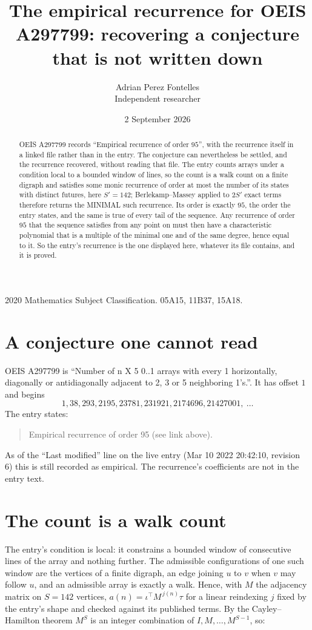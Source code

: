 \documentclass[11pt,a4paper]{article}
\title{The empirical recurrence for OEIS A297799: recovering a conjecture that is not written down}
\author{Adrian Perez Fontelles\\ \small Independent researcher}
\date{2 September 2026}
\theoremstyle{plain}
\theoremstyle{definition}
\begin{document}
\maketitle

\begin{abstract}
OEIS A297799 records ``Empirical recurrence of order $95$'', with the recurrence itself in a
linked file rather than in the entry. The conjecture can nevertheless be settled, and the
recurrence recovered, without reading that file. The entry counts arrays under a condition
local to a bounded window of lines, so the count is a walk count on a finite digraph and
satisfies some monic recurrence of order at most the number of its states with distinct
futures, here $S'=142$; Berlekamp--Massey applied to $2S'$ exact
terms therefore returns the MINIMAL such recurrence. Its order is exactly $95$, the order
the entry states, and the same is true of every tail of the sequence. Any recurrence of order
$95$ that the sequence satisfies from any point on must then have a characteristic
polynomial that is a multiple of the minimal one and of the same degree, hence equal to it. So
the entry's recurrence is the one displayed here, whatever its file contains, and it is
proved.
\end{abstract}

\noindent\small 2020 Mathematics Subject Classification. 05A15, 11B37, 15A18.\normalsize

\section{A conjecture one cannot read}

OEIS A297799 is ``Number of n X 5 0..1 arrays with every 1 horizontally, diagonally or antidiagonally adjacent to 2, 3 or 5 neighboring 1's.''. It has offset $1$ and begins
\[
1, 38, 293, 2195, 23781, 231921, 2174696, 21427001,\ \dots
\]
The entry states:
\begin{quote}
Empirical recurrence of order 95 (see link above).
\end{quote}
As of the ``Last modified'' line on the live entry (Mar 10 2022 20:42:10, revision 6) this is still
recorded as empirical. The recurrence's coefficients are not in the entry text.

\section{The count is a walk count}

The entry's condition is local: it constrains a bounded window of consecutive lines of the
array and nothing further. The admissible configurations of one such window are the vertices
of a finite digraph, an edge joining $u$ to $v$ when $v$ may follow $u$, and an admissible
array is exactly a walk. Hence, with $M$ the adjacency matrix on $S=142$ vertices,
$a(n)=\iota^{\!\top}M^{\,j(n)}\tau$ for a linear reindexing $j$ fixed by the entry's shape
and checked against its published terms. By the Cayley--Hamilton theorem $M^{S}$ is an
integer combination of $I,M,\dots,M^{S-1}$, so:
\end{document}
